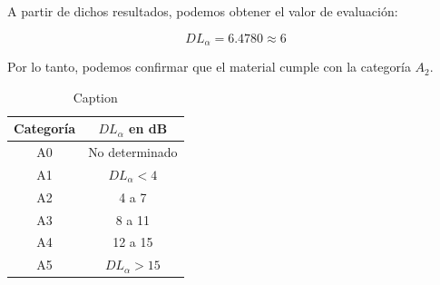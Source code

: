 \par A partir de dichos resultados, podemos obtener el valor de evaluación:

\begin{equation}
    DL_{\alpha} =  6.4780 \approx 6
\end{equation}

\par Por lo tanto, podemos confirmar que el material cumple con la categoría $A_2$.


\begin{table}[H]
    \centering
    \begin{tabular}{|c|c|} \hline
        \textbf{Categoría} & \textbf{$DL_\alpha$ en dB} \\ \hline \hline
        A0& No determinado \\ \hline
        A1& $DL_\alpha < 4$ \\ \hline
        A2& 4 a 7 \\ \hline
        A3& 8 a 11 \\ \hline
        A4& 12 a 15 \\ \hline
        A5& $DL_\alpha >15$ \\ \hline
    \end{tabular}
    \caption{Caption}
    \label{tab:my_label}
\end{table}